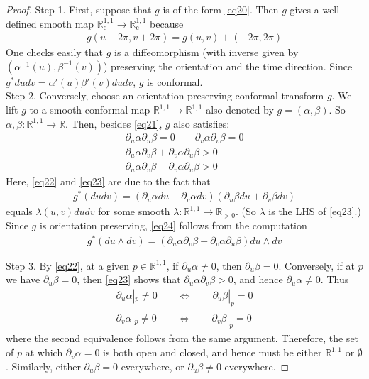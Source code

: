 \documentclass[12pt,b5paper,notitlepage]{article}
\theoremstyle{definition}
\theoremstyle{plain}
\newcommand{\Rbb}{\mathbb R}
\newcommand{\Rc}{\mathbb R^{1,1}_{\mathrm{c}}}
\numberwithin{equation}{section}
\begin{document}
\begin{proof}
Step 1. First, suppose that $g$ is of the form \eqref{eq20}. Then $g$ gives a well-defined smooth map $\Rc\rightarrow\Rc$ because
\begin{align}\label{eq21}
g(u-2\pi,v+2\pi)=g(u,v)+(-2\pi,2\pi)
\end{align}
One checks easily that $g$ is a diffeomorphism (with inverse given by $(\alpha^{-1}(u),\beta^{-1}(v))$) preserving the orientation and the time direction. Since $g^*dudv=\alpha'(u)\beta'(v)dudv$, $g$ is conformal.\\[-1ex]

Step 2. Conversely, choose an orientation preserving conformal transform $g$. We lift $g$ to a smooth conformal map $\Rbb^{1,1}\rightarrow\Rbb^{1,1}$ also denoted by $g=(\alpha,\beta)$. So $\alpha,\beta:\Rbb^{1,1}\rightarrow\Rbb$. Then, besides \eqref{eq21}, $g$ also satisfies:
\begin{gather*}
\partial_u\alpha\partial_u\beta=0\qquad \partial_v\alpha\partial_v\beta=0\tag{a}\label{eq22}\\
\partial_u\alpha\partial_v\beta+\partial_v\alpha\partial_u\beta>0 \tag{b}\label{eq23}\\
\partial_u\alpha\partial_v\beta-\partial_v\alpha\partial_u\beta>0 \tag{c}\label{eq24}
\end{gather*}
Here, \eqref{eq22} and \eqref{eq23} are due to the fact that
\begin{align*}
g^*(dudv)=(\partial_u\alpha du+\partial_v\alpha dv)(\partial_u\beta du+\partial_v\beta dv)
\end{align*}
equals $\lambda(u,v)dudv$ for some smooth $\lambda:\Rbb^{1,1}\rightarrow\Rbb_{>0}$. (So $\lambda$ is the LHS of \eqref{eq23}.) Since $g$ is orientation preserving, \eqref{eq24} follows from the computation
\begin{align*}
g^*(du\wedge dv)=(\partial_u\alpha\partial_v\beta-\partial_v\alpha\partial_u\beta)du\wedge dv
\end{align*}

Step 3. By \eqref{eq22}, at a given $p\in\Rbb^{1,1}$, if $\partial_u\alpha\neq0$, then $\partial_u\beta=0$. Conversely, if at $p$ we have $\partial_u\beta=0$, then \eqref{eq23} shows that $\partial_u\alpha\partial_v\beta>0$, and hence $\partial_u\alpha\neq0$. Thus
\begin{gather*}
\partial_u\alpha|_p\neq 0\qquad\Longleftrightarrow\qquad \partial_u\beta|_p=0\\
\partial_v\alpha|_p\neq 0\qquad\Longleftrightarrow\qquad \partial_v\beta|_p=0
\end{gather*}
where the second equivalence follows from the same argument. Therefore, the set of $p$ at which $\partial_v\alpha= 0$ is both open and closed, and hence must be either $\Rbb^{1,1}$ or $\emptyset$. Similarly, either $\partial_u\beta=0$ everywhere, or $\partial_u\beta\neq0$ everywhere.


\end{proof}
\end{document}

